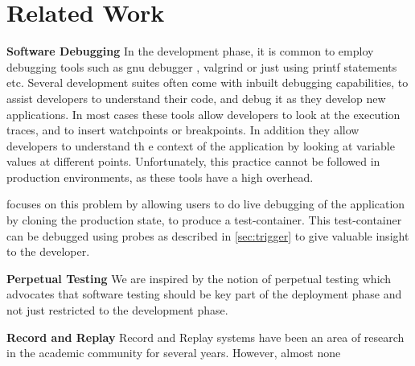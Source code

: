 \section{Related Work}
\label{sec:related}


  
\textbf{Software Debugging}  
  In the development phase, it is common to employ debugging tools such as gnu debugger \cite{gdb}, valgrind \cite{valgrind} or just using printf statements etc.
  Several development suites\cite{eclipse, visual_studio, intel_suite} often come with inbuilt debugging capabilities, to assist developers to understand their code, and debug it as they develop new applications.
  In most cases these tools allow developers to look at the execution traces, and to insert watchpoints or breakpoints.
  In addition they allow developers to understand th      e context of the application by looking at variable values at different points.
  Unfortunately, this practice cannot be followed in production environments, as these tools have a high overhead.
  
  \parikshan focuses on this problem by allowing users to do live debugging of the application by cloning the production state, to produce a test-container.
  This test-container can be debugged using probes as described in \ref{sec:trigger} to give valuable insight to the developer.
  
    
\textbf{Perpetual Testing}
     We are inspired by the notion of perpetual testing\cite{perpetual} which advocates that software testing should be key part of the deployment phase and not just restricted to the development phase.
  
\textbf{Record and Replay}  
  Record and Replay systems have been an area of research in the academic community for several years.
  However, almost none  
  
  \cite{altekar2009odr,dunlap2002revirt,guo2008r2, geels2007friday, laadan2010transparent}
  
  

